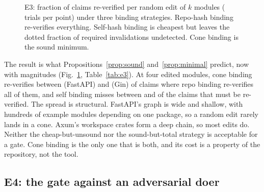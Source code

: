 \documentclass[conference]{IEEEtran}
\begin{document}
\begin{figure}[t]
  \caption{E3: fraction of claims re-verified per random edit of $k$ modules (\EThreeTrials{} trials per point) under three binding strategies. Repo-hash binding re-verifies everything. Self-hash binding is cheapest but leaves the dotted fraction of required invalidations undetected. Cone binding is the sound minimum.}
  \label{fig:e3}
\end{figure}

\begin{table}[t]
  \centering\footnotesize
  \caption{E3 at $k = 4$ edited modules: re-verification cost per strategy and the fraction of required invalidations the self-hash strategy misses.}
  \label{tab:e3}
  \resizebox{\linewidth}{!}{}
\end{table}

The result is what Propositions~\ref{prop:sound} and~\ref{prop:minimal} predict, now with magnitudes (Fig.~\ref{fig:e3}, Table~\ref{tab:e3}). At four edited modules, cone binding re-verifies between \EThreeMinConeCost{} (FastAPI) and \EThreeMaxConeCost{} (Gin) of claims where repo binding re-verifies all of them, and self binding misses between \EThreeMinSelfMissed{} and \EThreeMaxSelfMissed{} of the claims that must be re-verified. The spread is structural. FastAPI's graph is wide and shallow, with hundreds of example modules depending on one package, so a random edit rarely lands in a cone. Axum's workspace crates form a deep chain, so most edits do. Neither the cheap-but-unsound nor the sound-but-total strategy is acceptable for a gate. Cone binding is the only one that is both, and its cost is a property of the repository, not the tool.

\subsection{E4: the gate against an adversarial doer}
\end{document}
